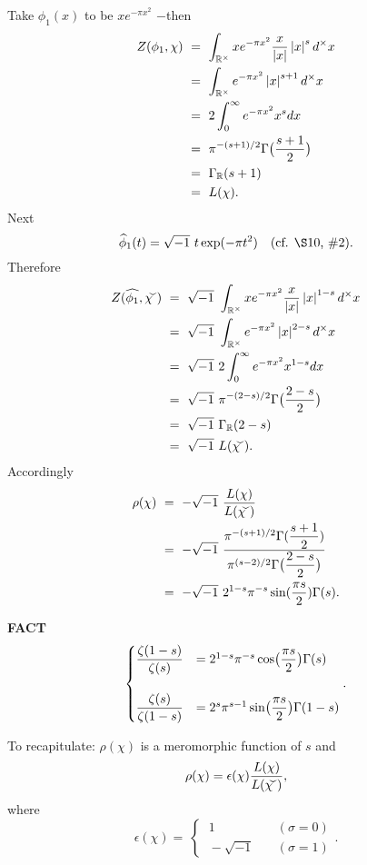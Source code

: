 \qquad \textbullet \quad {} \quad Take $\phi_1(x)$ to be $xe^{-\pi x^2}$ $-$then
\allowdisplaybreaks
\begin{align*}
Z(\phi_1, \chi) \ 
&=\  \int_{\R^\times} xe^{-\pi x^2} \frac{x}{\abs{x}} \abs{x}^s d^\times x\\	
&=\  \int_{\R^\times} e^{-\pi x^2}  \abs{x}^{s+1} d^\times x\\
&=\  2\int_0^\infty e^{-\pi x^2} x^s dx\\	
&=\  \pi^{-(s+1)/2} \Gamma\bigl(\frac{s+1}{2}\bigr)\\
&=\  \Gamma_\R(s+1)\\
&=\  L(\chi).
\end{align*}
Next
\[
\widehat{\phi}_1(t) = \sqrt{-1}\ t \exp(- \pi t^2) \quad \text{(cf. \S10, \#2)}.
\]
Therefore
\begin{align*}
Z(\widehat{\phi_1}, \widecheck{\chi}) \ 	
&=\  \sqrt{-1}\   \int_{\R^\times} xe^{-\pi x^2} \frac{x}{\abs{x}} \abs{x}^{1-s} d^\times x\\	
&=\  \sqrt{-1}\   \int_{\R^\times} e^{-\pi x^2}  \abs{x}^{2-s} d^\times x\\
&=\  \sqrt{-1}\   2\int_0^\infty e^{-\pi x^2} x^{1-s} dx\\	
&=\  \sqrt{-1}\  \pi^{-(2-s)/2} \Gamma\bigl(\frac{2-s}{2}\bigr)\\
&=\  \sqrt{-1}\  \Gamma_\R(2-s)\\
&=\  \sqrt{-1}\  L(\widecheck{\chi}).
\end{align*}
Accordingly
\begin{align*}
\rho(\chi) \ 
&=\  - \sqrt{-1}\  \ds\frac{L(\chi)}{L(\widecheck{\chi})}\\	
&=\  - \sqrt{-1}\   \frac{\pi^{-(s+1)/2} \Gamma(\ds\frac{s+1}{2})}{\pi^{(s-2)/2} \Gamma\bigl(\ds\frac{2-s}{2}\bigr)}\\	
&=\  - \sqrt{-1}\    2^{1-s} \pi^{-s} \sin(\ds\frac{\pi s}{2}) \Gamma(s).
\end{align*}

\vspace{0.1cm}

\begin{x}{\small\bf FACT} \ %
\[
\begin{cases}
\displaystyle\frac{\zeta(1-s)}{\zeta(s)} 	&= 2^{1-s} \pi^{-s} \cos\bigl(\displaystyle\frac{\pi s}{2}\bigr) \Gamma(s)\\
\\
\displaystyle\frac{\zeta(s)}{\zeta(1-s)} 	&= 2^{s} \pi^{s-1} \sin\bigl(\displaystyle\frac{\pi s}{2}\bigr) \Gamma(1-s)
\end{cases}
.
\]

\vspace{0.1cm}

To recapitulate: $\rho(\chi)$ is a meromorphic function of $s$ and 
\[
\rho(\chi) 	= \epsilon(\chi) \frac{L(\chi)}{L(\widecheck{\chi})},
\]
where
\[\epsilon(\chi) =\ 
\begin{cases}
\  1 				&\quad \text{$(\sigma = 0)$}\\
\  - \sqrt{-1} 	&\quad \text{$(\sigma = 1)$}
\end{cases}
.\]
\end{x}

